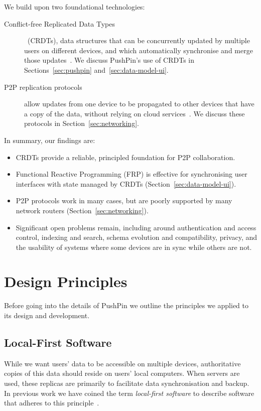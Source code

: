 \documentclass[sigplan,10pt]{acmart}
\begin{document}
We build upon two foundational technologies:
\begin{description}
\item[Conflict-free Replicated Data Types] ~(CRDTs), data structures that can be concurrently updated by multiple users on different devices, and which automatically synchronise and merge those updates~\cite{Shapiro:2011un,Gomes:2017gy}.
We discuss PushPin's use of CRDTs in Sections~\ref{sec:pushpin} and~\ref{sec:data-model-ui}.
\item[P2P replication protocols] allow updates from one device to be propagated to other devices that have a copy of the data, without relying on cloud services~\cite{Ogden:2018ur,Tarr:2019ba,Guy:1999gy}.
We discuss these protocols in Section~\ref{sec:networking}.
\end{description}

In summary, our findings are:
\begin{itemize}
    \item CRDTs provide a reliable, principled foundation for P2P collaboration.
    \item Functional Reactive Programming (FRP) is effective for synchronising user interfaces with state managed by CRDTs (Section~\ref{sec:data-model-ui}).
    \item P2P protocols work in many cases, but are poorly supported by many network routers (Section~\ref{sec:networking}).
    \item Significant open problems remain, including around authentication and access control, indexing and search, schema evolution and compatibility, privacy, and the usability of systems where some devices are in sync while others are not.
\end{itemize}

\section{Design Principles}\label{sec:principles}

Before going into the details of PushPin we outline the principles we applied to its design and development.

\subsection{Local-First Software}

While we want users' data to be accessible on multiple devices, authoritative copies of this data should reside on users' local computers.
When servers are used, these replicas are primarily to facilitate data synchronisation and backup.
In previous work we have coined the term \emph{local-first software} to describe software that adheres to this principle~\cite{LocalFirst}.
\end{document}
